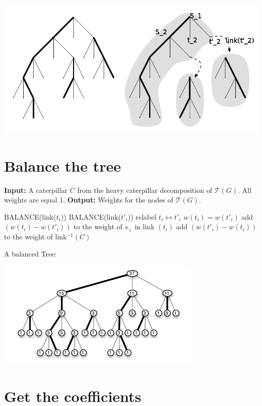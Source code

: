 \documentclass[10pt,a4paper]{article}
\newcommand{\Tau}{\mathcal{T}}
\begin{document}
\includegraphics[scale=1]{caterpillarEdit.png} 

\section{Balance the tree}
\begin{algorithmic}
\State \textbf{Input:} A caterpillar $C$ from the heavy caterpillar decomposition of $\Tau(G)$. All weights are equal 1.
\State \textbf{Output:} Weights for the nodes of $\Tau(G)$.

	\State BALANCE(link($t_i$))
	\State BALANCE(link($t'_i$))
        \State relabel $t_i \leftrightarrow t'_i$
    \EndIf
	\State $w(t_i)=w(t'_i)$
	\State add $(w(t_i ) - w(t'_i ))$ to the weight of $s_{\bot}$ in link $(t_i)$
	\State add $(w(t'_i ) - w(t_i ))$ to the weight of link$^{-1} (C)$
\EndFor
\EndFunction
\end{algorithmic}


A balanced Tree:

\includegraphics[scale=1]{balancedTree.png} 


\section{Get the coefficients}
\end{document}
